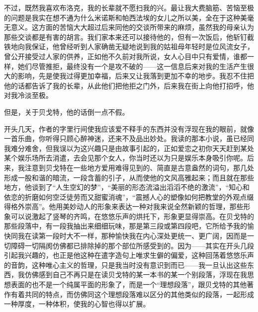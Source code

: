 \par 不过，既然我喜欢布洛克，我的长辈就不愿扫我的兴。最让我大费脑筋、苦恼至极的问题是我实在想不通为什么米诺斯和帕西法埃的女儿之所以美，全在于这种美毫无意义。这方面的苦恼大大超过后来同他的交谈所带来的麻烦，虽然我的母亲认为那些交谈都是有害的胡言。我们家本来还可以接待他的，但有一次饭后，他斩钉截铁地向我保证，他曾经听到人家确凿无疑地说到我的姑祖母年轻时是位风流女子，曾公开接受过人家的供养，正如他不久前对我所说，女人心目中只有爱情，谁都一样，她们尽管推拒，最终没有一个是攻不破的——这一信息后来对我的生活产生很大的影响，先是使我过得更加幸福，后来又让我落到更加不幸的地步。我忍不住把他的话都告诉了我的长辈，从此他们把他拒之门外，后来我在街上向他打招呼，他对我冷淡至极。
\par 但是，关于贝戈特，他的话倒一点不假。
\par 开头几天，作者的字里行间使我应该爱不释手的东西并没有浮现在我的眼前，就像一首乐曲，你听得只顾心醉神迷，还来不及品出妙处。我读的那本小说，虽已经同我难分难舍，但我误以为这兴趣只是由故事引起的，正如爱恋之初你天天赶到某处某个娱乐场所去消遣，去会见那个女人，你当时还以为只是娱乐本身吸引你呢。后来，我注意到贝戈特在一些地方爱用难得见到的、简直是古意盎然的词句，那几处形成一股和谐的暗流，一段含蓄的引子，从而使他的文风高雅起来；而且就在那些地方，他谈到了“人生空幻的梦”，“美丽的形态流溢出滔滔不绝的激流”，“知心和依恋的折磨如何空泛徒劳而又甜蜜消魂”，“震撼人心的塑像如何把教堂的外观点缀得格外崇高”。他用美妙动人的形象来表达一种对我来说全然新颖的哲理，那些形象可以说激起了竖琴的齐鸣，在悠悠乐声的烘托下，形象更显得崇高。在贝戈特的那些段落中，有一段我抽出来细细玩味，那是第三段或第四段吧，它所给予我的愉快同我在读第一段时大不一样，那种愉快我在内心深处更统一、更广阔，因而是一切障碍一切隔阂仿佛都已排除掉的那个部位所感受到的。因为——其实在开头几段引起我兴趣的，也正是他这种在遣字造句上唯求生僻的偏爱，这种回荡着悠悠乐声的音韵，这种唯心主义的哲理，只是我当时没有意识到而已——我一旦认出这些东西，我仿佛感到自己不再只是在读贝戈特的某一本书的某一个别段落，浮现在我思想表面的也不是一个纯属平面的形象了，而是一个“理想段落”，跟贝戈特的其他著作有着共同的特点，而仿佛同这个理想段落难以区分的其他类似的段落，一起形成一种厚度，一种体积，使我的心智也得以扩展。
